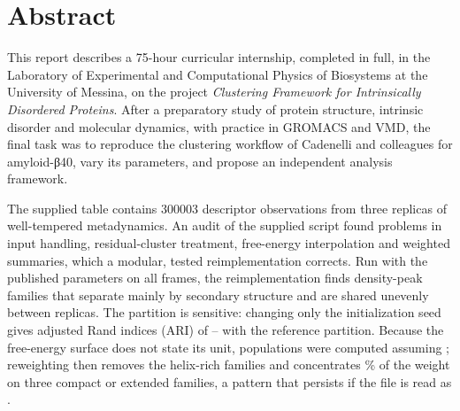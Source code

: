 \documentclass[a4paper,11pt,oneside,numbers=noenddot,headings=normal,bibliography=totoc,listof=totoc]{scrreprt}
\begin{document}
\begin{titlepage}
\null\vfill
\end{titlepage}
\chapter*{Abstract}
This report describes a 75-hour curricular internship, completed in full, in the Laboratory of Experimental and Computational Physics of Biosystems at the University of Messina, on the project \emph{Clustering Framework for Intrinsically Disordered Proteins}. After a preparatory study of protein structure, intrinsic disorder and molecular dynamics, with practice in GROMACS and VMD, the final task was to reproduce the clustering workflow of Cadenelli and colleagues for amyloid-β40, vary its parameters, and propose an independent analysis framework.

The supplied table contains \num{300003} descriptor observations from three replicas of well-tempered metadynamics. An audit of the supplied script found problems in input handling, residual-cluster treatment, free-energy interpolation and weighted summaries, which a modular, tested reimplementation corrects. Run with the published parameters on all frames, the reimplementation finds \DPCFamilies{} density-peak families that separate mainly by secondary structure and are shared unevenly between replicas. The partition is sensitive: changing only the initialization seed gives adjusted Rand indices (ARI) of \DPCSeedARIMin--\DPCSeedARIMax{} with the reference partition. Because the free-energy surface does not state its unit, populations were computed assuming \kJmol; reweighting then removes the helix-rich families and concentrates \WTopThree\% of the weight on three compact or extended families, a pattern that persists if the file is read as \kcalmol.
\end{document}
